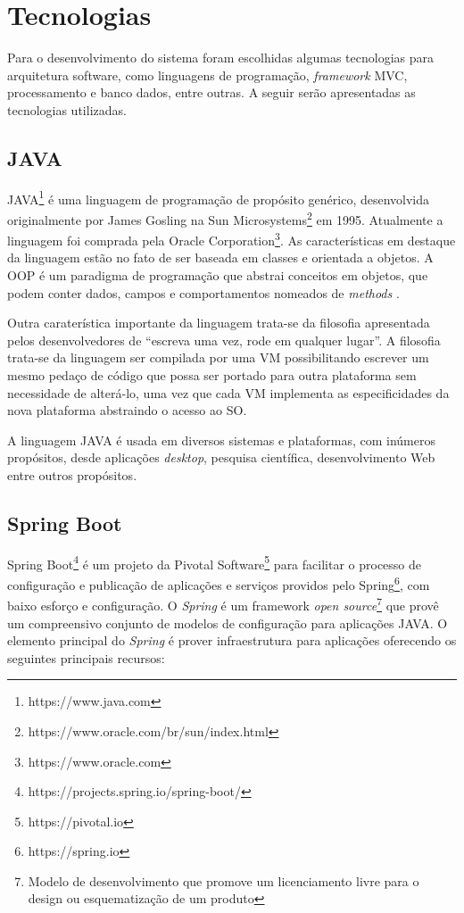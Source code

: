 \section{Tecnologias}

Para o desenvolvimento do sistema foram escolhidas algumas tecnologias para arquitetura software, como linguagens de programação, \textit{framework} \ac{MVC}, processamento e banco dados, entre outras. A seguir serão apresentadas as tecnologias utilizadas.

\subsection{JAVA}

JAVA\footnote{https://www.java.com} é uma linguagem de programação de propósito genérico, desenvolvida originalmente por James Gosling na Sun Microsystems\footnote{ https://www.oracle.com/br/sun/index.html} em 1995. Atualmente a linguagem foi comprada pela Oracle Corporation\footnote{https://www.oracle.com}. As características em destaque da linguagem estão no fato de ser baseada em classes e orientada a objetos. A \ac{OOP} é um paradigma de programação que abstrai conceitos em objetos, que podem conter dados, campos e comportamentos nomeados de \textit{methods} \citep{Lewis2000}. 

Outra caraterística importante da linguagem trata-se da filosofia apresentada pelos desenvolvedores de “escreva uma vez, rode em qualquer lugar”. A filosofia trata-se da linguagem ser compilada por uma \ac{VM} possibilitando escrever um mesmo pedaço de código que possa ser portado para outra plataforma sem necessidade de alterá-lo, uma vez que cada \ac{VM} implementa as especificidades da nova plataforma abstraindo o acesso ao \ac{SO}.

A linguagem JAVA é usada em diversos sistemas e plataformas, com inúmeros propósitos, desde aplicações \textit{desktop}, pesquisa científica, desenvolvimento Web entre outros propósitos.

\subsection{Spring Boot}

Spring Boot\footnote{https://projects.spring.io/spring-boot/} é um projeto da Pivotal Software\footnote{https://pivotal.io} para facilitar o processo de configuração e publicação de aplicações e serviços providos pelo Spring\footnote{https://spring.io}, com baixo esforço e configuração. O \textit{Spring} é um framework \textit{open source}\footnote{Modelo de desenvolvimento que promove um licenciamento livre para o design ou esquematização de um produto} que provê um compreensivo conjunto de modelos de configuração para aplicações JAVA. O elemento principal do \textit{Spring} é prover infraestrutura para aplicações oferecendo os seguintes principais recursos:


